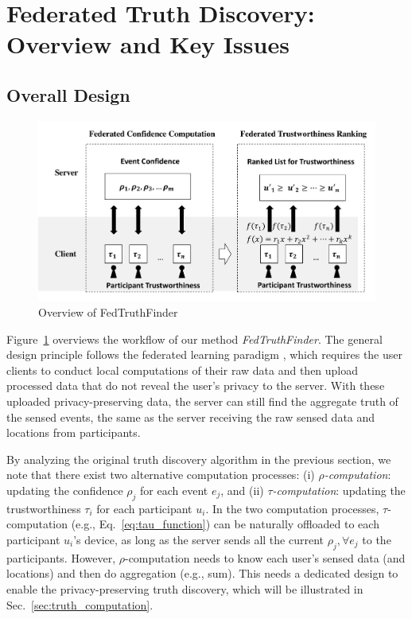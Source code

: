 \section{Federated Truth Discovery: Overview and Key Issues}

\subsection{Overall Design}

\begin{figure}
	\centering
	\includegraphics[width=.8\linewidth]{submissions/LeyeWang/fig/overview.pdf}
	\caption{Overview of FedTruthFinder}
	\label{fig:overview}
\end{figure}

Figure~\ref{fig:overview} overviews the workflow of our method \textit{FedTruthFinder}. The general design principle follows the federated learning paradigm \citep{yang2019federated}, which requires the user clients to conduct local computations of their raw data and then upload processed data that do not reveal the user's privacy to the server. With these uploaded privacy-preserving data, the server can still find the aggregate truth of the sensed events, the same as the server receiving the raw sensed data and locations from participants.

By analyzing the original truth discovery algorithm in the previous section, we note that there exist two alternative computation processes: (i) \textit{$\rho$-computation}: updating the confidence $\rho_j$ for each event $e_j$, and (ii) \textit{$\tau$-computation}: updating the trustworthiness $\tau_i$ for each participant $u_i$. In the two computation processes, $\tau$-computation (e.g., Eq.~\ref{eq:tau_function}) can be naturally offloaded to each participant $u_i$'s device, as long as the server sends all the current $\rho_j, \forall e_j$ to the participants. However, $\rho$-computation needs to know each user's sensed data (and locations) and then do aggregation (e.g., sum). This needs a dedicated design to enable the privacy-preserving truth discovery, which will be illustrated in Sec.~\ref{sec:truth_computation}.

